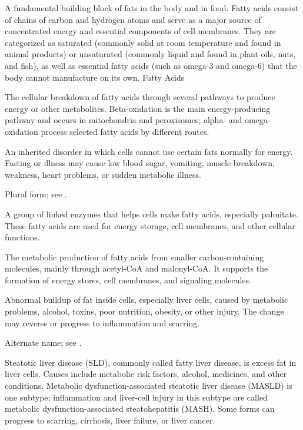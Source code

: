  A fundamental building block of fats in the body and in food. Fatty acids consist of chains of carbon and hydrogen atoms and serve as a major source of concentrated energy and essential components of cell membranes. They are categorized as saturated (commonly solid at room temperature and found in animal products) or unsaturated (commonly liquid and found in plant oils, nuts, and fish), as well as essential fatty acids (such as omega-3 and omega-6) that the body cannot manufacture on its own.
\synonyms
Fatty Acids

 The cellular breakdown of fatty acids through several pathways to produce energy or other metabolites. Beta-oxidation is the main energy-producing pathway and occurs in mitochondria and peroxisomes; alpha- and omega-oxidation process selected fatty acids by different routes.

 An inherited disorder in which cells cannot use certain fats normally for energy. Fasting or illness may cause low blood sugar, vomiting, muscle breakdown, weakness, heart problems, or sudden metabolic illness.

 Plural form; see .

 A group of linked enzymes that helps cells make fatty acids, especially palmitate. These fatty acids are used for energy storage, cell membranes, and other cellular functions.

 The metabolic production of fatty acids from smaller carbon-containing molecules, mainly through acetyl-CoA and malonyl-CoA. It supports the formation of energy stores, cell membranes, and signaling molecules.

 Abnormal buildup of fat inside cells, especially liver cells, caused by metabolic problems, alcohol, toxins, poor nutrition, obesity, or other injury. The change may reverse or progress to inflammation and scarring.

 Alternate name; see .

 Steatotic liver disease (SLD), commonly called fatty liver disease, is excess fat in liver cells. Causes include metabolic risk factors, alcohol, medicines, and other conditions. Metabolic dysfunction-associated steatotic liver disease (MASLD) is one subtype; inflammation and liver-cell injury in this subtype are called metabolic dysfunction-associated steatohepatitis (MASH). Some forms can progress to scarring, cirrhosis, liver failure, or liver cancer.

